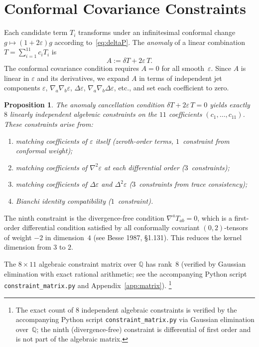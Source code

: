 \documentclass[11pt,a4paper]{article}
\newtheorem{proposition}[theorem]{Proposition}
\begin{document}
\section{Conformal Covariance Constraints}
\label{sec:constraints}

Each candidate term $T_i$ transforms under an infinitesimal conformal
change $g \mapsto (1+2\varepsilon)g$ according to~\eqref{eq:deltaP}.
The \emph{anomaly} of a linear combination $T = \sum_{i=1}^{11} c_i T_i$ is
\[
  A := \delta T + 2\varepsilon\, T.
\]
The conformal covariance condition requires $A = 0$ for all smooth~$\varepsilon$.
Since $A$ is linear in $\varepsilon$ and its derivatives, we expand
$A$ in terms of independent jet components $\varepsilon$,
$\nabla_a\nabla_b\varepsilon$,
$\Delta\varepsilon$,
$\nabla_a\nabla_b\Delta\varepsilon$, etc.,
and set each coefficient to zero.

\begin{proposition}
\label{prop:9constraints}
The anomaly cancellation condition $\delta T + 2\varepsilon\,T = 0$ yields
exactly $8$ linearly independent algebraic constraints on the $11$
coefficients $(c_1, \ldots, c_{11})$.
These constraints arise from:
\begin{enumerate}[label=(\alph*)]
  \item matching coefficients of $\varepsilon$ itself (zeroth-order terms,
    $1$~constraint from conformal weight);
  \item matching coefficients of $\nabla^2\varepsilon$ at each differential
    order ($3$~constraints);
  \item matching coefficients of $\Delta\varepsilon$ and
    $\Delta^2\varepsilon$ ($3$~constraints from trace consistency);
  \item Bianchi identity compatibility ($1$~constraint).
\end{enumerate}
\end{proposition}

The ninth constraint is the divergence-free condition
$\nabla^a T_{ab} = 0$, which is a first-order differential condition
satisfied by all conformally covariant $(0,2)$-tensors of weight $-2$ in
dimension~$4$ (see Besse 1987, \S1.131). This reduces the kernel dimension
from $3$ to $2$.

The $8 \times 11$ algebraic constraint matrix over $\mathbb{Q}$ has rank~$8$
(verified by Gaussian elimination with exact rational arithmetic;
see the accompanying Python script \texttt{constraint\_matrix.py}
and Appendix~\ref{app:matrix}).%
\footnote{The exact count of $8$ independent algebraic constraints is
verified by the accompanying Python script \texttt{constraint\_matrix.py}
via Gaussian elimination over~$\mathbb{Q}$; the ninth (divergence-free)
constraint is differential of first order and is not part of the
algebraic matrix.}
\end{document}
